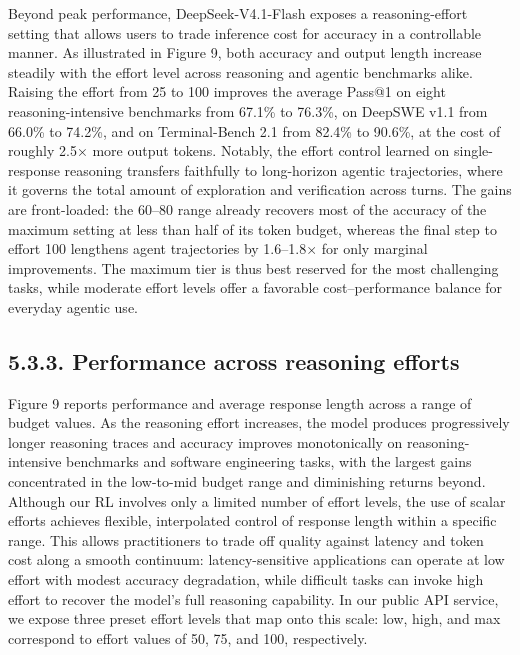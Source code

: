 \documentclass[
  10
]{article}
\begin{document}
Beyond peak performance, DeepSeek-V4.1-Flash exposes a reasoning-effort
setting that allows users to trade inference cost for accuracy in a
controllable manner. As illustrated in Figure 9, both accuracy and
output length increase steadily with the effort level across reasoning
and agentic benchmarks alike. Raising the effort from 25 to 100 improves
the average Pass@1 on eight reasoning-intensive benchmarks from 67.1\%
to 76.3\%, on DeepSWE v1.1 from 66.0\% to 74.2\%, and on Terminal-Bench
2.1 from 82.4\% to 90.6\%, at the cost of roughly 2.5× more output
tokens. Notably, the effort control learned on single-response reasoning
transfers faithfully to long-horizon agentic trajectories, where it
governs the total amount of exploration and verification across turns.
The gains are front-loaded: the 60--80 range already recovers most of
the accuracy of the maximum setting at less than half of its token
budget, whereas the final step to effort 100 lengthens agent
trajectories by 1.6--1.8× for only marginal improvements. The maximum
tier is thus best reserved for the most challenging tasks, while
moderate effort levels offer a favorable cost--performance balance for
everyday agentic use.

\subsection{5.3.3. Performance across reasoning
efforts}\label{performance-across-reasoning-efforts}

Figure 9 reports performance and average response length across a range
of budget values. As the reasoning effort increases, the model produces
progressively longer reasoning traces and accuracy improves
monotonically on reasoning-intensive benchmarks and software engineering
tasks, with the largest gains concentrated in the low-to-mid budget
range and diminishing returns beyond. Although our RL involves only a
limited number of effort levels, the use of scalar efforts achieves
flexible, interpolated control of response length within a specific
range. This allows practitioners to trade off quality against latency
and token cost along a smooth continuum: latency-sensitive applications
can operate at low effort with modest accuracy degradation, while
difficult tasks can invoke high effort to recover the model's full
reasoning capability. In our public API service, we expose three preset
effort levels that map onto this scale: low, high, and max correspond to
effort values of 50, 75, and 100, respectively.
\end{document}
